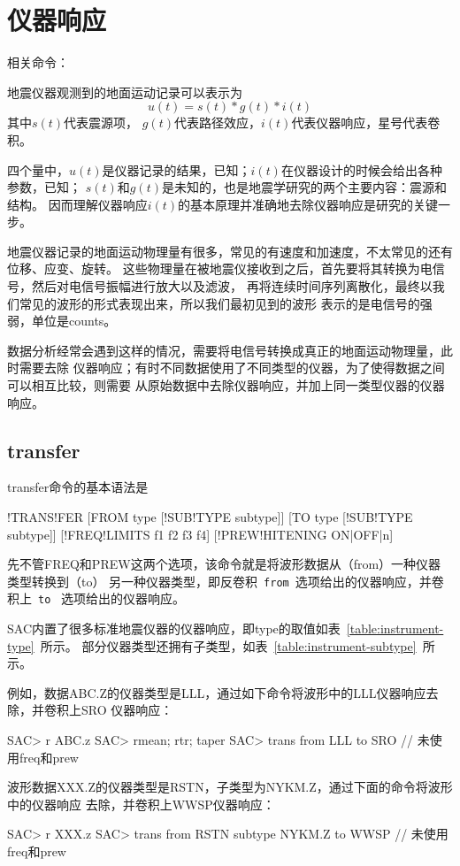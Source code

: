 \section{仪器响应}
\label{sec:instrument-response}
相关命令：

地震仪器观测到的地面运动记录可以表示为
\[  u(t) = s(t) * g(t) * i(t) \]
其中$s(t)$代表震源项， $g(t)$代表路径效应，$i(t)$代表仪器响应，星号代表卷积。

四个量中，$u(t)$是仪器记录的结果，已知；$i(t)$在仪器设计的时候会给出各种参数，已知；
$s(t)$和$g(t)$是未知的，也是地震学研究的两个主要内容：震源和结构。
因而理解仪器响应$i(t)$的基本原理并准确地去除仪器响应是研究的关键一步。

地震仪器记录的地面运动物理量有很多，常见的有速度和加速度，不太常见的还有位移、应变、旋转。
这些物理量在被地震仪接收到之后，首先要将其转换为电信号，然后对电信号振幅进行放大以及滤波，
再将连续时间序列离散化，最终以我们常见的波形的形式表现出来，所以我们最初见到的波形
表示的是电信号的强弱，单位是counts。

数据分析经常会遇到这样的情况，需要将电信号转换成真正的地面运动物理量，此时需要去除
仪器响应；有时不同数据使用了不同类型的仪器，为了使得数据之间可以相互比较，则需要
从原始数据中去除仪器响应，并加上同一类型仪器的仪器响应。

\subsection{transfer}
transfer命令的基本语法是
\begin{SACSTX}
!TRANS!FER [FROM type [!SUB!TYPE subtype]] [TO type [!SUB!TYPE subtype]]
[!FREQ!LIMITS f1 f2 f3 f4] [!PREW!HITENING ON|OFF|n]
\end{SACSTX}

先不管FREQ和PREW这两个选项，该命令就是将波形数据从（from）一种仪器类型转换到（to）
另一种仪器类型，即反卷积~\lstinline{from}~选项给出的仪器响应，并卷积上~\lstinline{to}~
选项给出的仪器响应。

SAC内置了很多标准地震仪器的仪器响应，即type的取值如表~\ref{table:instrument-type}~所示。
部分仪器类型还拥有子类型，如表~\ref{table:instrument-subtype}~所示。

例如，数据ABC.Z的仪器类型是LLL，通过如下命令将波形中的LLL仪器响应去除，并卷积上SRO
仪器响应：
\begin{SACCode}
SAC> r ABC.z
SAC> rmean; rtr; taper
SAC> trans from LLL to SRO      // 未使用freq和prew
\end{SACCode}

波形数据XXX.Z的仪器类型是RSTN，子类型为NYKM.Z，通过下面的命令将波形中的仪器响应
去除，并卷积上WWSP仪器响应：
\begin{SACCode}
SAC> r XXX.z
SAC> trans from RSTN subtype NYKM.Z to WWSP  // 未使用freq和prew
\end{SACCode}

